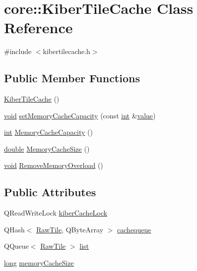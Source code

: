 \hypertarget{classcore_1_1_kiber_tile_cache}{\section{core\-:\-:Kiber\-Tile\-Cache Class Reference}
\label{classcore_1_1_kiber_tile_cache}
}


{\ttfamily \#include $<$kibertilecache.\-h$>$}

\subsection*{Public Member Functions}
\begin{DoxyCompactItemize}
\item 
\hyperlink{group___o_p_map_widget_gab36dfabac7ab5e960efd54b890b15173}{Kiber\-Tile\-Cache} ()
\item 
\hyperlink{group___u_a_v_objects_plugin_ga444cf2ff3f0ecbe028adce838d373f5c}{void} \hyperlink{group___o_p_map_widget_ga53ccfe7e5f07ce218a4920d86b7fa95e}{set\-Memory\-Cache\-Capacity} (const \hyperlink{ioapi_8h_a787fa3cf048117ba7123753c1e74fcd6}{int} \&\hyperlink{glext_8h_aa0e2e9cea7f208d28acda0480144beb0}{value})
\item 
\hyperlink{ioapi_8h_a787fa3cf048117ba7123753c1e74fcd6}{int} \hyperlink{group___o_p_map_widget_ga1ac798743593d55d294a659bf03cd367}{Memory\-Cache\-Capacity} ()
\item 
\hyperlink{_super_l_u_support_8h_a8956b2b9f49bf918deed98379d159ca7}{double} \hyperlink{group___o_p_map_widget_ga79164b194a65febe6f0b0f29fec3e002}{Memory\-Cache\-Size} ()
\item 
\hyperlink{group___u_a_v_objects_plugin_ga444cf2ff3f0ecbe028adce838d373f5c}{void} \hyperlink{group___o_p_map_widget_ga7c3b50dd97465e188bb3e322b9717c5f}{Remove\-Memory\-Overload} ()
\end{DoxyCompactItemize}
\subsection*{Public Attributes}
\begin{DoxyCompactItemize}
\item 
Q\-Read\-Write\-Lock \hyperlink{group___o_p_map_widget_ga33731aa2cecd7ba1200e9871f3380308}{kiber\-Cache\-Lock}
\item 
Q\-Hash$<$ \hyperlink{classcore_1_1_raw_tile}{Raw\-Tile}, Q\-Byte\-Array $>$ \hyperlink{group___o_p_map_widget_ga632c3be1045d7e97d09885aba0c18100}{cachequeue}
\item 
Q\-Queue$<$ \hyperlink{classcore_1_1_raw_tile}{Raw\-Tile} $>$ \hyperlink{group___o_p_map_widget_ga097b545fed7bd5b8be78160165f4f6f5}{list}
\item 
\hyperlink{ioapi_8h_a3c7b35ad9dab18b8310343c201f7b27e}{long} \hyperlink{group___o_p_map_widget_gae96e4700fe984a52afd8c8016dc1295b}{memory\-Cache\-Size}
\end{DoxyCompactItemize}


